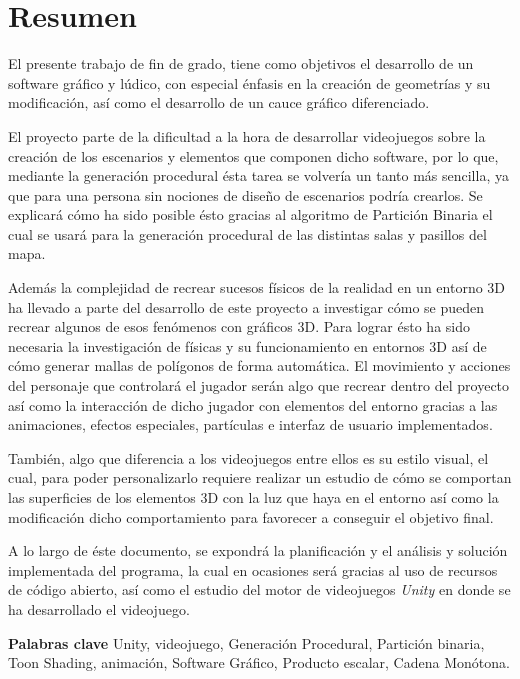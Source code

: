 \chapter{Resumen}
    El presente trabajo de fin de grado, tiene como objetivos el desarrollo de un software gráfico y lúdico, con especial énfasis en la creación de geometrías y su modificación, así como el desarrollo de un cauce gráfico diferenciado.

    El proyecto parte de la dificultad a la hora de desarrollar videojuegos sobre la creación de los escenarios y elementos que componen dicho software, por lo que, mediante la generación procedural ésta tarea se volvería un tanto más sencilla, ya que para una persona sin nociones de diseño de escenarios podría crearlos. Se explicará cómo ha sido posible ésto gracias al algoritmo de Partición Binaria el cual se usará para la generación procedural de las distintas salas y pasillos del mapa.
    
    Además la complejidad de recrear sucesos físicos de la realidad en un entorno 3D ha llevado a parte del desarrollo de este proyecto a investigar cómo se pueden recrear algunos de esos fenómenos con gráficos 3D. Para lograr ésto ha sido necesaria la investigación de físicas y su funcionamiento en entornos 3D así de cómo generar mallas de polígonos de forma automática.  El movimiento y acciones del personaje que controlará el jugador serán algo que recrear dentro del proyecto así como la interacción de dicho jugador con elementos del entorno gracias a las animaciones, efectos especiales, partículas e interfaz de usuario implementados.

    También, algo que diferencia a los videojuegos entre ellos es su estilo visual, el cual, para poder personalizarlo requiere realizar un estudio de cómo se comportan las superficies de los elementos 3D con la luz que haya en el entorno así como la modificación dicho comportamiento para favorecer a conseguir el objetivo final.

    A lo largo de éste documento, se expondrá la planificación y el análisis y solución implementada del programa, la cual en ocasiones será gracias al uso de recursos de código abierto, así como el estudio del motor de videojuegos \textit{Unity} en donde se ha desarrollado el videojuego.

    \textbf{Palabras clave} Unity, videojuego, Generación Procedural, Partición binaria, Toon Shading, animación, Software Gráfico, Producto escalar, Cadena Monótona.
    
